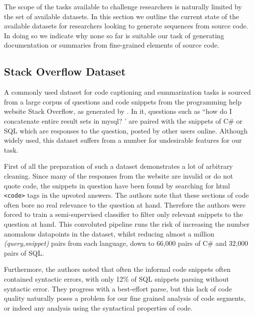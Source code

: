 The scope of the tasks available to challenge researchers is naturally limited by the set of available datasets.
In this section we outline the current state of the available datasets for researchers looking to generate sequences from source code. In doing so we indicate why none so far is suitable our task of generating documentation or summaries from fine-grained elements of source code.

\subsection{Stack Overflow Dataset}

A commonly used dataset for code captioning and summarization tasks is sourced from a large corpus of questions and code snippets from the programming help website Stack Overflow, as generated by \citet{iyer_summarizing_2016}. In it, questions such as ``how do I concatenate entire result sets in mysql? ' are paired with the snippets of C\# or SQL which are responses to the question, posted by other users online.
Although widely used, this dataset suffers from a number for undesirable features for our task. 

First of all the preparation of such a dataset demonstrates a lot of arbitrary cleaning.
Since many of the responses from the website are invalid or do not quote code, the snippets in question have been found by searching for html \texttt{<code>} tags in the upvoted answers. 
The authors note that these sections of code often bore no real relevance to the question at hand. Therefore the authors were forced to train a semi-supervised classifier to filter only relevant snippets to the question at hand.
This convoluted pipeline runs the risk of increasing the number anomalous datapoints in the dataset, whilst reducing almost a million \textit{(query,snippet)} pairs from each language, down to 66,000 pairs  of C\# and 32,000 pairs of SQL.

Furthermore, the authors noted that often the informal code snippets often contained syntactic errors, with only 12\% of SQL snippets parsing without syntactic error. They progress with a best-effort parse, but this lack of code quality naturally poses a problem for our fine grained analysis of code segments, or indeed any analysis using the syntactical properties of code.

